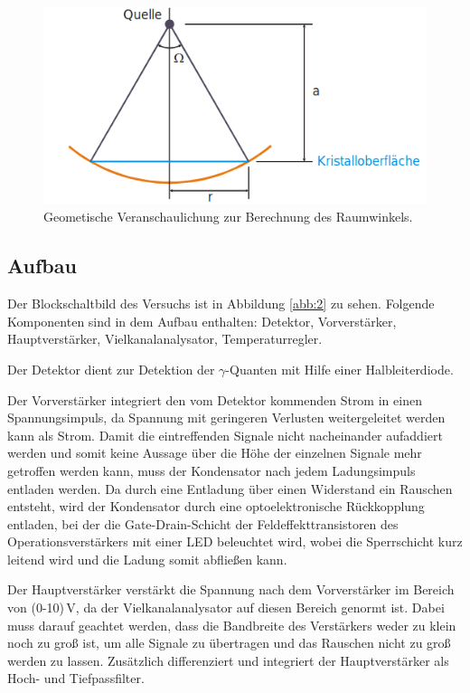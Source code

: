 \begin{figure}
  \centering
  \includegraphics[scale=0.7]{Raumwinkel.png}
  \caption{Geometische Veranschaulichung zur Berechnung des Raumwinkels. \cite{Q1}}
  \label{abb:Raumwinkel}
\end{figure}

\subsection{Aufbau}

Der Blockschaltbild des Versuchs ist in Abbildung \ref{abb:2} zu sehen. Folgende
Komponenten sind in dem Aufbau enthalten: Detektor, Vorverstärker, Hauptverstärker,
Vielkanalanalysator, Temperaturregler.

Der Detektor dient zur Detektion der $\gamma$-Quanten mit Hilfe
einer Halbleiterdiode.

Der Vorverstärker integriert den vom Detektor
kommenden Strom in einen Spannungsimpuls, da Spannung mit geringeren
Verlusten weitergeleitet werden kann als Strom. Damit die eintreffenden Signale
nicht nacheinander aufaddiert werden und somit keine Aussage über die Höhe der
einzelnen Signale mehr getroffen werden kann, muss der Kondensator nach jedem
Ladungsimpuls entladen werden. Da durch eine
Entladung über einen Widerstand ein Rauschen entsteht, wird der Kondensator
durch eine optoelektronische Rückkopplung entladen, bei der die
Gate-Drain-Schicht der Feldeffekttransistoren
des Operationsverstärkers mit einer LED beleuchtet wird, wobei die
Sperrschicht kurz leitend wird und die Ladung somit abfließen kann.

Der Hauptverstärker verstärkt die Spannung
nach dem Vorverstärker im Bereich von (0-10)\,\si{\volt}, da der
Vielkanalanalysator auf diesen Bereich genormt ist. Dabei muss darauf
geachtet werden, dass die Bandbreite
des Verstärkers weder zu klein noch zu groß ist, um alle Signale zu
übertragen und das Rauschen nicht zu groß werden zu lassen.
Zusätzlich differenziert und integriert der Hauptverstärker als Hoch- und
Tiefpassfilter.

